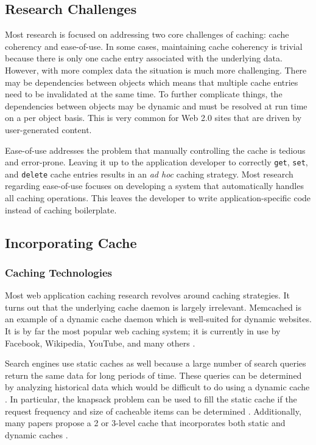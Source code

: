 \documentclass[12pt]{ucthesis}
\begin{document}
\subsection{Research Challenges}
Most research is focused on addressing two core challenges of caching: cache coherency and ease-of-use.
In some cases, maintaining cache coherency is trivial because there is only one cache entry associated with the underlying data.
However, with more complex data the situation is much more challenging.
There may be dependencies between objects which means that multiple cache entries need to be invalidated at the same time.
To further complicate things, the dependencies between objects may be dynamic and must be resolved at run time on a per object basis.
This is very common for Web 2.0 sites that are driven by user-generated content.

Ease-of-use addresses the problem that manually controlling the cache is tedious and error-prone.
Leaving it up to the application developer to correctly {\tt get}, {\tt set}, and {\tt delete} cache entries results in an \textit{ad hoc} caching strategy.
Most research regarding ease-of-use focuses on developing a system that automatically handles all caching operations.
This leaves the developer to write application-specific code instead of caching boilerplate.

\subsection{Incorporating Cache}
\subsubsection{Caching Technologies}
Most web application caching research revolves around caching strategies.
It turns out that the underlying cache daemon is largely irrelevant.
\textsf{Memcached} is an example of a dynamic cache daemon which is well-suited for dynamic websites.
It is by far the most popular web caching system; it is currently in use by \textsf{Facebook}, \textsf{Wikipedia}, \textsf{YouTube}, and many others \cite{memcachedDotOrg}.

Search engines use static caches as well because a large number of search queries return the same data for long periods of time.
These queries can be determined by analyzing historical data which would be difficult to do using a dynamic cache \cite{designTradeOffsSearchEngine}.
In particular, the knapsack problem can be used to fill the static cache if the request frequency and size of cacheable items can be determined \cite{designTradeOffsSearchEngine}.
Additionally, many papers propose a 2 or 3-level cache that incorporates both static and dynamic caches \cite{cacheAdmissionPolicies, designTradeOffsSearchEngine}.
\end{document}
